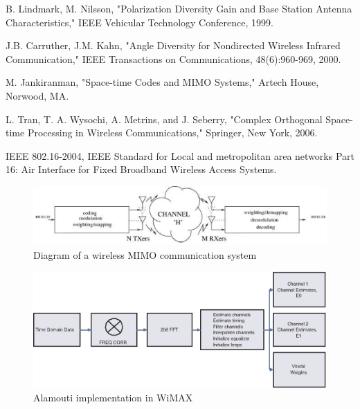 \begin{thebibliography}{99}
B. Lindmark, M. Nilsson, "Polarization Diversity Gain and Base
Station Antenna Characteristics," IEEE Vehicular Technology
Conference, 1999.

J.B. Carruther, J.M. Kahn, "Angle Diversity for Nondirected Wireless
Infrared Communication," IEEE Transactions on Communications,
48(6):960-969, 2000.

M. Jankiranman, "Space-time Codes and MIMO Systems," Artech House,
Norwood, MA.

L. Tran, T. A. Wysochi, A. Metrins, and J. Seberry, "Complex
Orthogonal Space-time Processing in Wireless Communications,"
Springer, New York, 2006.

IEEE 802.16-2004, IEEE Standard for Local and metropolitan area
networks Part 16: Air Interface for Fixed Broadband Wireless Access
Systems.

\end{thebibliography}

\clearpage

\begin{figure}
    \centering
        \includegraphics{Chapter1/Fig001.eps}
    \caption{Diagram of a wireless MIMO communication system}
    \label{fig:Fig1}
\end{figure}

\begin{figure}
    \centering
        \includegraphics{Chapter1/Fig002.eps}
    \caption{Alamouti implementation in WiMAX}
    \label{fig:Fig2}
\end{figure}

